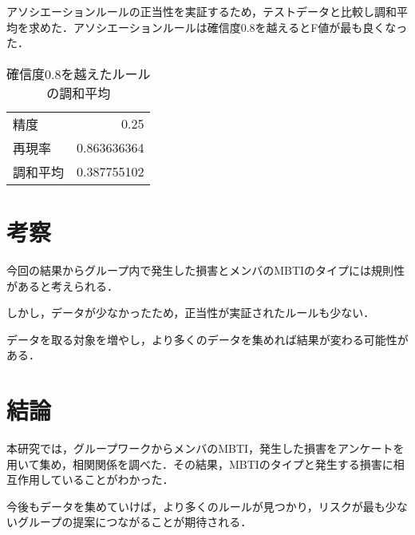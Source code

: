 \documentclass[uplatex,twocolumn,dvipdfmx]{jsarticle}
\begin{document}
アソシエーションルールの正当性を実証するため，テストデータと比較し調和平均を求めた．アソシエーションルールは確信度0.8を越えるとF値が最も良くなった．

\renewcommand{\arraystretch}{0.75}
\begin{table}[htbp]
\centering
\caption{確信度0.8を越えたルールの調和平均}\label{調和平均算出結果}
\begin{tabular}{l|r}
\hline
精度 & 0.25\\
再現率 & 0.863636364\\
調和平均 & 0.387755102\\
\hline
\end{tabular}
\end{table}
\renewcommand{\arraystretch}{0.75}


\section{考察}
今回の結果からグループ内で発生した損害とメンバのMBTIのタイプには規則性があると考えられる．

しかし，データが少なかったため，正当性が実証されたルールも少ない．

データを取る対象を増やし，より多くのデータを集めれば結果が変わる可能性がある．

\section{結論}
本研究では，グループワークからメンバのMBTI，発生した損害をアンケートを用いて集め，相関関係を調べた．その結果，MBTIのタイプと発生する損害に相互作用していることがわかった．

今後もデータを集めていけば，より多くのルールが見つかり，リスクが最も少ないグループの提案につながることが期待される．
\nocite{MBTI}
\nocite{110009915588}

\end{document}
